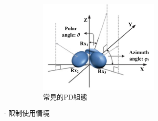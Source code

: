 \begin{description}
        \begin{figure}[ht]
            \centering
            \includegraphics[width=6cm]{ch2pic/config_orient.png}
            \caption{常見的PD組態\cite{case:3d_layers}}
            \label{pic:config_orient}
        \end{figure}
        
        \item[- 限制使用情境]\hfill 
        
        \qquad



    \end{description}





        
